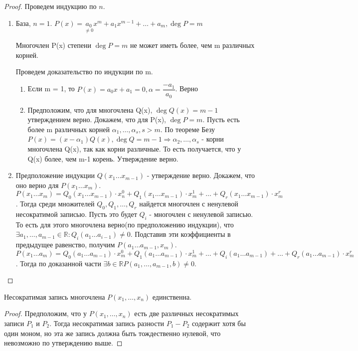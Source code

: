 \begin{proof}
	Проведем индукцию по $n$.
	\begin{enumerate}
		\item  База, $n = 1$. \(P(x) = \underset{\ne0}{a_0}x^m+a_1x^{m-1}+\ldots+a_m, \deg P =m\)
		\begin{proposition}
			Многочлен P(x) степени \(\deg P = m\) не может иметь более, чем m различных корней.
		\end{proposition}
		Проведем доказательство по индукции по m.
		\begin{enumerate}
			\item Если m = 1, то \(P(x) = a_0x+a_1 = 0, \alpha = \dfrac{-a_1}{a_0}\). Верно
			\item Предположим, что для многочлена Q(x), \(\deg Q(x) = m - 1\) утверждением верно. Докажем, что для P(x), \(\deg P = m\). Пусть есть более m различных корней \(\alpha_1, \ldots, \alpha_s, s>m\). По теореме Безу \(P(x) = (x-\alpha_1)Q(x), \deg Q = m-1\Longrightarrow \alpha_2,\ldots, \alpha_s\) - корни многочлена Q(x), так как корни различные. То есть получается, что у Q(x) более, чем m-1 корень. Утверждение верно.
		\end{enumerate}
		\item Предположение индукции \(Q(x_1\ldots x_{m-1})\) - утверждение верно. Докажем, что оно верно для \(P(x_1\ldots x_m)\). \(P(x_1\ldots x_m) = Q_0(x_1\ldots x_{m-1})\cdot x_n^0 + Q_1(x_1\ldots x_{m-1})\cdot x_m^1+\ldots+Q_r(x_1\ldots x_{m-1})\cdot x_m^r\). Тогда среди множителей \(Q_0, Q_1, \ldots, Q_r\) найдется многочлен с ненулевой несократимой записью. Пусть это будет \(Q_i\) - многочлен с ненулевой записью. То есть для этого многочлена верно(по предположению индукции), что \(\exists a_1,\ldots, a_{m-1}\in \mathbb{R}: Q_i(a_1\ldots a_{i-1})\ne0\). Подставив эти коэффициенты в предыдущее равенство, получим \(P(a_1\ldots a_{m-1}, x_m)\). \(P(x_1\ldots a_m) = Q_0(a_1\ldots a_{m-1})\cdot x_m^0 + Q_1(a_1\ldots a_{m-1})\cdot x_m^1+\ldots+Q_i(a_1\ldots a_{m-1})+\ldots+Q_r(a_1\ldots a_{m-1})\cdot x_m^r\). Тогда по доказанной части \(\exists b\in\mathbb{R} P(a_1,\ldots,a_{m-1}, b)\ne 0\).
	\end{enumerate}
\end{proof}

\begin{corollary}
	Несократимая запись многочлена $P(x_1, \dotsc, x_n)$ единственна.
\end{corollary}

\begin{proof}
	Предположим, что у $P(x_1,\dots, x_n)$ есть две различных несократимых записи $P_1$ и $P_2$. Тогда несократимая запись разности $P_1 - P_2$ содержит хотя бы один моном, но эта же запись должна быть тождественно нулевой, что невозможно по утверждению выше.
\end{proof}
